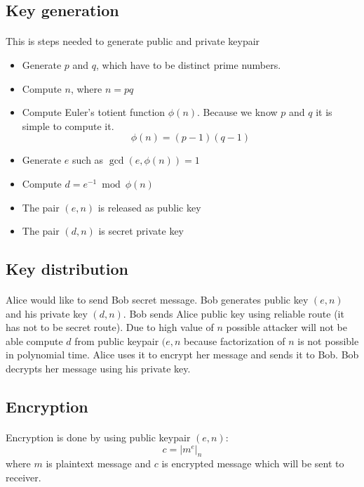 \documentclass[thesis=B,english]{FITthesis}[2012/10/20]
\begin{document}
{\subsection{Key generation}
\paragraph*{}
{This is steps needed to generate public and private keypair}
\begin{itemize}
 \item Generate \(p\) and \(q\), which have to be distinct prime numbers.
 \item Compute \(n\), where \(n = p  q\)
 \item Compute Euler's totient function \(\phi(n)\). Because we know \(p\) and \(q\) it is simple to compute it. \[\phi(n) = (p - 1)(q - 1)\]
 \item Generate \(e\) such as \(\gcd(e,\phi(n)) = 1\) 
 \item Compute \(d = e^{-1}\bmod{\phi(n)} \)
 \item The pair \((e,n)\) is released as public key
 \item The pair \((d,n)\) is secret private key
\end{itemize}

\subsection{Key distribution}
\paragraph*{}
{Alice would like to send Bob secret message. Bob generates public key \((e,n)\) and his private key \((d,n)\). Bob sends Alice public key using reliable route (it has not to be secret route).
Due to high value of \(n\) possible attacker will not be able compute \(d\) from public keypair \((e,n\) because factorization of \(n\) is not possible in polynomial time.
Alice uses it to encrypt her message and sends it to Bob. Bob decrypts her message using his private key.}

\subsection{Encryption}
\paragraph*{}
{Encryption is done by using public keypair \((e, n)\): \[c = | m^e | _n\]
where \(m\) is plaintext message and \(c\) is encrypted message which will be sent to receiver.
}
}
\end{document}
